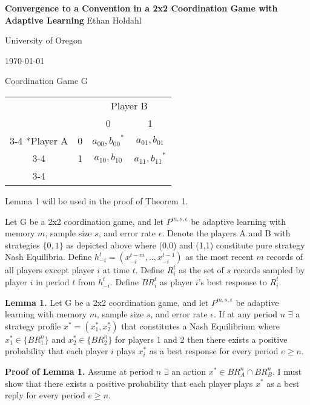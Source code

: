 \documentclass[12pt]{article}
\begin{document}
\centering
\Large
\textbf{Convergence to a Convention in a 2x2 Coordination Game with Adaptive Learning}
\vskip0pt
Ethan Holdahl

\large
University of Oregon

\today

\vskip24pt

\centering
Coordination Game G
\vskip6pt
\begin{tabular}{cc|c|c|}
      & \multicolumn{1}{c}{} & \multicolumn{2}{c}{Player B}\\
      & \multicolumn{1}{c}{} & \multicolumn{1}{c}{0}  & \multicolumn{1}{c}{1} \\\cline{3-4}
      \multirow{2}*{Player A}  & 0 & ${a_{00},b_{00}}^*$ & $a_{01},b_{01}$ \\\cline{3-4}
      & 1 & $a_{10},b_{10}$ & ${a_{11},b_{11}}^*$ \\\cline{3-4}
    \end{tabular}
\vskip24pt

\raggedright

Lemma 1 will be used in the proof of Theorem 1.

\vskip12pt
Let G be a 2x2 coordination game, and let $P^{m,s,\epsilon}$ be adaptive learning with memory $m$, sample size $s$, and error rate $\epsilon$.
Denote the players A and B with strategies $\{0,1\}$ as depicted above where (0,0) and (1,1) constitute pure strategy Nash Equilibria. Define $h_{-i}^{t}=(x_{-i}^{t-m},..,x_{-i}^{t-1})$ as the most recent $m$ records of all players except player $i$ at time $t$. Define $R_i^{t}$ as the set of $s$ records sampled by player $i$ in period $t$ from $h_{-i}^{t}$. Define $BR_i^{t}$ as player $i$'s best response to $R_i^{t}$.

\vskip12pt

\textbf{Lemma 1.} Let G be a 2x2 coordination game, and let $P^{m,s,\epsilon}$ be adaptive learning with memory $m$, sample size $s$, and error rate $\epsilon$. If at any period $n$ $\exists$ a strategy profile $x^* = (x^*_1,x^*_2)$ that constitutes a Nash Equilibrium where $x^*_1 \in \{BR_1^{n}\}$ and $x^*_2 \in \{BR_2^{n}\}$ for players 1 and 2 then there exists a positive probability that each player $i$ plays $x^*_i$ as a best response for every period $e \geq n$.

\vskip12pt

\textbf{Proof of Lemma 1.} Assume at period $n$ $\exists$ an action $ x^* \in BR_A^{n} \cap BR_B^{n}$. I must show that there exists a positive probability that each player plays $x^*$ as a best reply for every period $e \geq n$.
\end{document}
